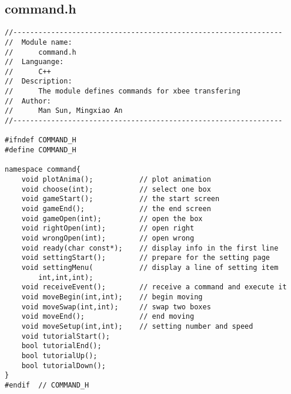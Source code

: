 \subsection{command.h}
\begin{verbatim}
//----------------------------------------------------------------
//  Module name:
//      command.h
//  Languange:
//      C++
//  Description:
//      The module defines commands for xbee transfering
//  Author:
//      Man Sun, Mingxiao An
//----------------------------------------------------------------

#ifndef COMMAND_H
#define COMMAND_H

namespace command{
    void plotAnima();           // plot animation
    void choose(int);           // select one box
    void gameStart();           // the start screen
    void gameEnd();             // the end screen
    void gameOpen(int);         // open the box
    void rightOpen(int);        // open right
    void wrongOpen(int);        // open wrong
    void ready(char const*);    // display info in the first line
    void settingStart();        // prepare for the setting page
    void settingMenu(           // display a line of setting item
        int,int,int);
    void receiveEvent();        // receive a command and execute it
    void moveBegin(int,int);    // begin moving
    void moveSwap(int,int);     // swap two boxes
    void moveEnd();             // end moving
    void moveSetup(int,int);    // setting number and speed
    void tutorialStart();
    bool tutorialEnd();
    bool tutorialUp();
    bool tutorialDown();
}
#endif  // COMMAND_H
\end{verbatim}

